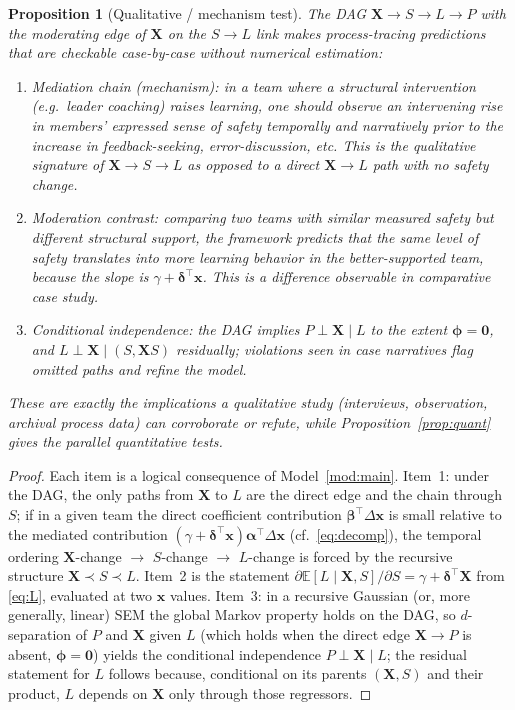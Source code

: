 \documentclass{amsart}
\theoremstyle{definition}
\theoremstyle{plain}
\newtheorem{proposition}{Proposition}
\begin{document}
\begin{proposition}[Qualitative / mechanism test]\label{prop:qual}
The DAG $\bm X\to S\to L\to P$ with the moderating edge of $\bm X$ on the $S\to L$ link
makes \emph{process-tracing} predictions that are checkable case-by-case without numerical
estimation:
\begin{enumerate}
\item \emph{Mediation chain (mechanism)}: in a team where a structural intervention
(e.g.\ leader coaching) raises learning, one should observe an intervening rise in members'
expressed sense of safety \emph{temporally and narratively prior} to the increase in
feedback-seeking, error-discussion, etc. This is the qualitative signature of
$\bm X\to S\to L$ as opposed to a direct $\bm X\to L$ path with no safety change.
\item \emph{Moderation contrast}: comparing two teams with similar measured safety but
different structural support, the framework predicts that the \emph{same} level of safety
translates into more learning behavior in the better-supported team, because the slope is
$\gamma+\bm\delta^\top\bm x$. This is a difference observable in comparative case study.
\item \emph{Conditional independence}: the DAG implies $P\perp \bm X \mid L$ to the extent
$\bm\phi=\bm0$, and $L\perp\bm X\mid (S,\bm X S)$ residually; violations seen in case
narratives flag omitted paths and refine the model.
\end{enumerate}
These are exactly the implications a qualitative study (interviews, observation, archival
process data) can corroborate or refute, while Proposition~\ref{prop:quant} gives the
parallel quantitative tests.
\end{proposition}
\begin{proof}
Each item is a logical consequence of Model~\ref{mod:main}. Item~1: under the DAG, the only
paths from $\bm X$ to $L$ are the direct edge and the chain through $S$; if in a given team
the direct coefficient contribution $\bm\beta^\top\Delta\bm x$ is small relative to the
mediated contribution $(\gamma+\bm\delta^\top\bm x)\bm\alpha^\top\Delta\bm x$
(cf.\ \eqref{eq:decomp}), the temporal ordering $\bm X$-change $\to$ $S$-change $\to$
$L$-change is forced by the recursive structure $\bm X\prec S\prec L$. Item~2 is the
statement $\partial\mathbb E[L\mid\bm X,S]/\partial S=\gamma+\bm\delta^\top\bm X$ from
\eqref{eq:L}, evaluated at two $\bm x$ values. Item~3: in a recursive Gaussian (or, more
generally, linear) SEM the global Markov property holds on the DAG, so $d$-separation of $P$
and $\bm X$ given $L$ (which holds when the direct edge $\bm X\to P$ is absent,
$\bm\phi=\bm0$) yields the conditional independence $P\perp\bm X\mid L$; the residual
statement for $L$ follows because, conditional on its parents $(\bm X,S)$ and their product,
$L$ depends on $\bm X$ only through those regressors.
\end{proof}
\end{document}
